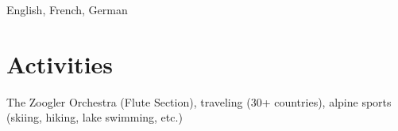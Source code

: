 \documentclass[margin,line]{resume}
\begin{document}
\begin{resume}
  English, French, German

  \section{\mysidestyle Activities}

  The Zoogler Orchestra (Flute Section), traveling (30+ countries), alpine sports (skiing, hiking, lake swimming, etc.)


\end{resume}
\end{document}

